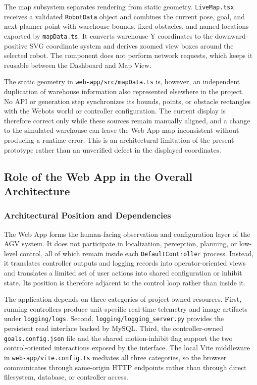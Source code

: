 The map subsystem separates rendering from static geometry. \texttt{LiveMap.tsx} receives a validated \texttt{RobotData} object and combines the current pose, goal, and next planner point with warehouse bounds, fixed obstacles, and named locations exported by \texttt{mapData.ts}. It converts warehouse Y coordinates to the downward-positive SVG coordinate system and derives zoomed view boxes around the selected robot. The component does not perform network requests, which keeps it reusable between the Dashboard and Map View.

The static geometry in \texttt{web-app/src/mapData.ts} is, however, an independent duplication of warehouse information also represented elsewhere in the project. No API or generation step synchronizes its bounds, points, or obstacle rectangles with the Webots world or controller configuration. The current display is therefore correct only while these sources remain manually aligned, and a change to the simulated warehouse can leave the Web App map inconsistent without producing a runtime error. This is an architectural limitation of the present prototype rather than an unverified defect in the displayed coordinates.

\subsection{Role of the Web App in the Overall Architecture}
\label{subsec:webapp-overall-role}

\subsubsection{Architectural Position and Dependencies}

The Web App forms the human-facing observation and configuration layer of the AGV system. It does not participate in localization, perception, planning, or low-level control, all of which remain inside each \texttt{DefaultController} process. Instead, it translates controller outputs and logging records into operator-oriented views and translates a limited set of user actions into shared configuration or inhibit state. Its position is therefore adjacent to the control loop rather than inside it.

The application depends on three categories of project-owned resources. First, running controllers produce unit-specific real-time telemetry and image artifacts under \texttt{logging/logs}. Second, \texttt{logging/logging\_server.py} provides the persistent read interface backed by MySQL. Third, the controller-owned \texttt{goals.config.json} file and the shared motion-inhibit flag support the two control-oriented interactions exposed by the interface. The local Vite middleware in \texttt{web-app/vite.config.ts} mediates all three categories, so the browser communicates through same-origin HTTP endpoints rather than through direct filesystem, database, or controller access.

